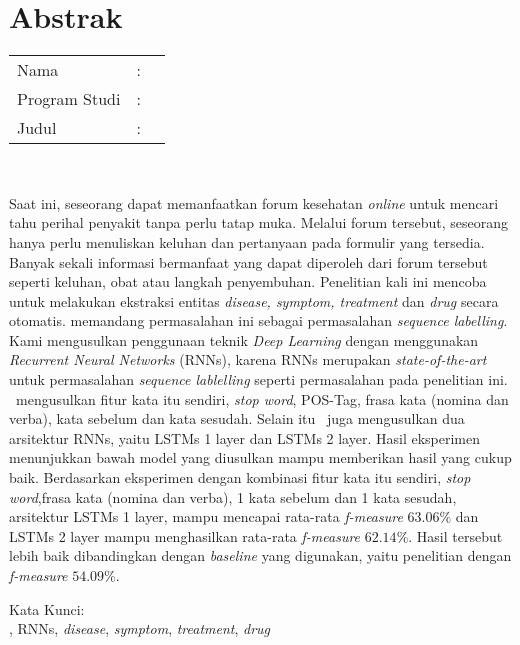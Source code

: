 %
%
%

\chapter*{Abstrak}

\vspace*{0.2cm}

\noindent \begin{tabular}{l l p{10cm}}
	Nama&: & \penulis \\
	Program Studi&: & \program \\
	Judul&: & \judul \\
\end{tabular} \\ 

\vspace*{0.5cm}

\noindent
Saat ini, seseorang dapat memanfaatkan forum kesehatan \textit{online} untuk mencari tahu perihal penyakit tanpa perlu tatap muka.  Melalui forum tersebut, seseorang hanya perlu menuliskan keluhan dan pertanyaan pada formulir yang tersedia. Banyak sekali informasi bermanfaat yang dapat diperoleh dari forum tersebut seperti keluhan, obat atau langkah penyembuhan. Penelitian kali ini mencoba untuk melakukan ekstraksi entitas \textit{disease, symptom, treatment} dan \textit{drug} secara otomatis. \Saya memandang permasalahan ini sebagai permasalahan \textit{sequence labelling}. Kami mengusulkan penggunaan teknik \textit{Deep Learning} dengan menggunakan \textit{Recurrent Neural Networks} (RNNs), karena RNNs merupakan \textit{state-of-the-art} untuk permasalahan \textit{sequence lablelling} seperti permasalahan pada penelitian ini. \Saya~mengusulkan fitur kata itu sendiri, \textit{stop word}, POS-Tag, frasa kata (nomina dan verba), kata sebelum dan kata sesudah. Selain itu \saya~juga mengusulkan dua arsitektur RNNs, yaitu LSTMs 1 layer dan LSTMs 2 layer. Hasil eksperimen menunjukkan bawah model yang diusulkan mampu memberikan hasil yang cukup baik. Berdasarkan eksperimen dengan kombinasi fitur kata itu sendiri, \textit{stop word},frasa kata (nomina dan verba), 1 kata sebelum dan 1 kata sesudah, arsitektur LSTMs 1 layer, mampu mencapai rata-rata \textit{f-measure} $ 63.06\% $ dan LSTMs 2 layer mampu menghasilkan rata-rata \textit{f-measure} $ 62.14\% $. Hasil tersebut lebih baik dibandingkan dengan \textit{baseline} yang digunakan, yaitu penelitian \cite{skripsiKakRadit} dengan \textit{f-measure} $ 54.09\% $.


\vspace*{0.2cm}

\noindent Kata Kunci: \\ 
\noindent \mer, RNNs, \textit{disease}, \textit{symptom}, \textit{treatment}, \textit{drug} \\ 

\newpage
